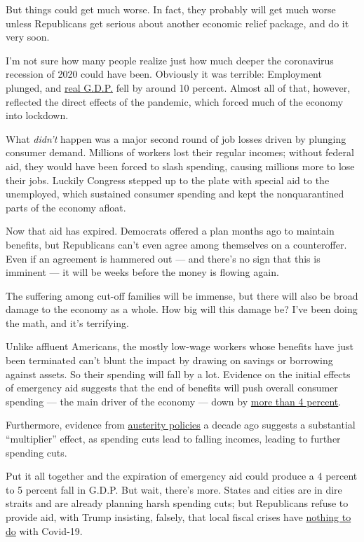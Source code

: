 But things could get much worse. In fact, they probably will get much
worse unless Republicans get serious about another economic relief
package, and do it very soon.

I'm not sure how many people realize just how much deeper the
coronavirus recession of 2020 could have been. Obviously it was
terrible: Employment plunged, and
\href{https://fred.stlouisfed.org/graph/fredgraph.png?g=tN5v}{real
G.D.P.} fell by around 10 percent. Almost all of that, however,
reflected the direct effects of the pandemic, which forced much of the
economy into lockdown.

What \emph{didn't} happen was a major second round of job losses driven
by plunging consumer demand. Millions of workers lost their regular
incomes; without federal aid, they would have been forced to slash
spending, causing millions more to lose their jobs. Luckily Congress
stepped up to the plate with special aid to the unemployed, which
sustained consumer spending and kept the nonquarantined parts of the
economy afloat.

Now that aid has expired. Democrats offered a plan months ago to
maintain benefits, but Republicans can't even agree among themselves on
a counteroffer. Even if an agreement is hammered out --- and there's no
sign that this is imminent --- it will be weeks before the money is
flowing again.

The suffering among cut-off families will be immense, but there will
also be broad damage to the economy as a whole. How big will this damage
be? I've been doing the math, and it's terrifying.

Unlike affluent Americans, the mostly low-wage workers whose benefits
have just been terminated can't blunt the impact by drawing on savings
or borrowing against assets. So their spending will fall by a lot.
Evidence on the initial effects of emergency aid suggests that the end
of benefits will push overall consumer spending --- the main driver of
the economy --- down by
\href{https://twitter.com/p_ganong/status/1289213387830960128}{more than
4 percent}.

Furthermore, evidence from
\href{https://www.imf.org/external/pubs/ft/wp/2013/wp1301.pdf}{austerity
policies} a decade ago suggests a substantial ``multiplier'' effect, as
spending cuts lead to falling incomes, leading to further spending cuts.

Put it all together and the expiration of emergency aid could produce a
4 percent to 5 percent fall in G.D.P. But wait, there's more. States and
cities are in dire straits and are already planning harsh spending cuts;
but Republicans refuse to provide aid, with Trump insisting, falsely,
that local fiscal crises have
\href{https://twitter.com/kaylatausche/status/1291129767832543233}{nothing
to do} with Covid-19.

